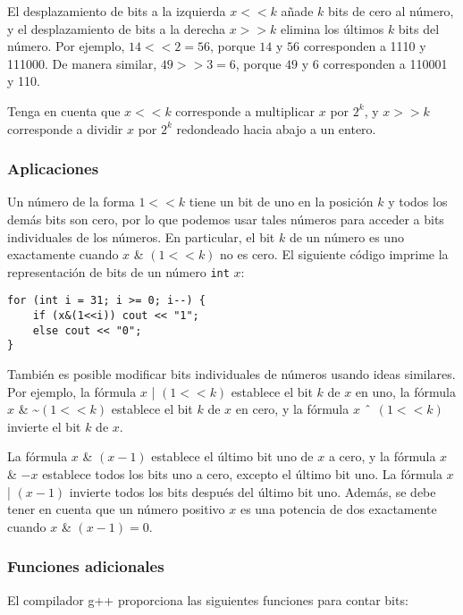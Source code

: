 
El desplazamiento de bits a la izquierda $x < < k$ añade $k$
bits de cero al número,
y el desplazamiento de bits a la derecha $x > > k$
elimina los últimos $k$ bits del número.
Por ejemplo, $14 < < 2 = 56$,
porque $14$ y $56$ corresponden a 1110 y 111000.
De manera similar, $49 > > 3 = 6$,
porque $49$ y $6$ corresponden a 110001 y 110.

Tenga en cuenta que $x < < k$
corresponde a multiplicar $x$ por $2^k$,
y $x > > k$
corresponde a dividir $x$ por $2^k$
redondeado hacia abajo a un entero.

\subsubsection{Aplicaciones}

Un número de la forma $1 < < k$ tiene un bit de uno
en la posición $k$ y todos los demás bits son cero,
por lo que podemos usar tales números para acceder a bits individuales de los números.
En particular, el bit $k$ de un número es uno
exactamente cuando $x$ \& $(1 < < k)$ no es cero.
El siguiente código imprime la representación de bits
de un número \texttt{int} $x$:

\begin{lstlisting}
for (int i = 31; i >= 0; i--) {
    if (x&(1<<i)) cout << "1";
    else cout << "0";
}
\end{lstlisting}

También es posible modificar bits individuales
de números usando ideas similares.
Por ejemplo, la fórmula $x$ | $(1 < < k)$
establece el bit $k$ de $x$ en uno,
la fórmula
$x$ \& \textasciitilde $(1 < < k)$
establece el bit $k$ de $x$ en cero,
y la fórmula
$x$ $\XOR$ $(1 < < k)$
invierte el bit $k$ de $x$.

La fórmula $x$ \& $(x-1)$ establece el último
bit uno de $x$ a cero,
y la fórmula $x$ \& $-x$ establece todos los
bits uno a cero, excepto el último bit uno.
La fórmula $x$ | $(x-1)$
invierte todos los bits después del último bit uno.
Además, se debe tener en cuenta que un número positivo $x$ es
una potencia de dos exactamente cuando $x$ \& $(x-1) = 0$.

\subsubsection*{Funciones adicionales}

El compilador g++ proporciona las siguientes
funciones para contar bits:

